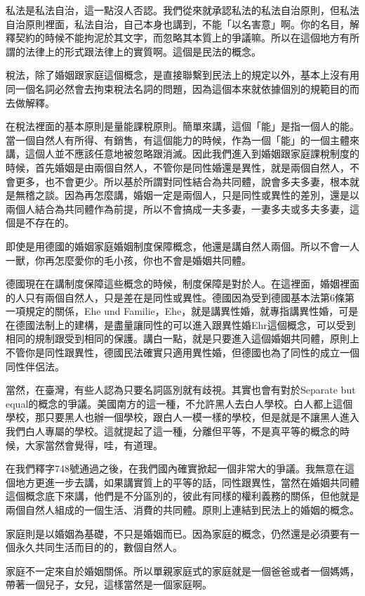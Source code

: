\documentclass[]{ctexbook}
\begin{document}
私法是私法自治，這一點沒人否認。我們從來就承認私法的私法自治原則，但私法自治原則裡面，私法自治，自己本身也講到，不能「以名害意」啊。你的名目，解釋契約的時候不能拘泥於其文字，而忽略其本質上的爭議嘛。所以在這個地方有所謂的法律上的形式跟法律上的實質啊。這個是民法的概念。

稅法，除了婚姻跟家庭這個概念，是直接聯繫到民法上的規定以外，基本上沒有用同一個名詞必然會去拘束稅法名詞的問題，因為這個本來就依據個別的規範目的而去做解釋。

在稅法裡面的基本原則是量能課稅原則。簡單來講，這個「能」是指一個人的能。當一個自然人有所得、有銷售，有這個能力的時候，作為一個「能」的一個主體來講，這個人並不應該任意地被忽略跟消滅。因此我們進入到婚姻跟家庭課稅制度的時候，首先婚姻是由兩個自然人，不管你是同性婚還是異性，就是兩個自然人，不會更多，也不會更少。所以基於所謂對同性結合為共同體，說會多夫多妻，根本就是無稽之談。因為再怎麼講，婚姻一定是兩個人，只是同性或異性的差別，還是以兩個人結合為共同體作為前提，所以不會搞成一夫多妻，一妻多夫或多夫多妻，這個是不存在的。

即使是用德國的婚姻家庭婚姻制度保障概念，他還是講自然人兩個。所以不會一人一獸，你再怎麼愛你的毛小孩，你也不會是婚姻共同體。

德國現在在講制度保障這些概念的時候，制度保障是對於人。在這裡面，婚姻裡面的人只有兩個自然人，只是差在是同性或異性。德國因為受到德國基本法第6條第一項規定的關係，Ehe und Familie，Ehe，就是講異性婚，就專指講異性婚，可是在德國法制上的建構，是盡量讓同性的可以進入跟異性婚Ehr這個概念，可以受到相同的規制跟受到相同的保護。講白一點，就是只要進入這個婚姻共同體，原則上不管你是同性跟異性，德國民法確實只適用異性婚，但德國也為了同性的成立一個同性伴侶法。

當然，在臺灣，有些人認為只要名詞區別就有歧視。其實也會有對於Separate but equal的概念的爭議。美國南方的這一種，不允許黑人去白人學校。白人都上這個學校，那只要黑人也辦一個學校，跟白人一模一樣的學校，但是就是不讓黑人進入我們白人專屬的學校。這就提起了這一種，分離但平等，不是真平等的概念的時候，大家當然會覺得，哇，有道理。

在我們釋字748號通過之後，在我們國內確實掀起一個非常大的爭議。我無意在這個地方更進一步去講，如果講實質上的平等的話，同性跟異性，當然在婚姻共同體這個概念底下來講，他們是不分區別的，彼此有同樣的權利義務的關係，但他就是兩個自然人組成的一個生活、消費的共同體。原則上連結到民法上的婚姻的概念。

家庭則是以婚姻為基礎，不只是婚姻而已。因為家庭的概念，仍然還是必須要有一個永久共同生活而目的的，數個自然人。

家庭不一定來自於婚姻關係。所以單親家庭式的家庭就是一個爸爸或者一個媽媽，帶著一個兒子，女兒，這樣當然是一個家庭啊。
\end{document}
